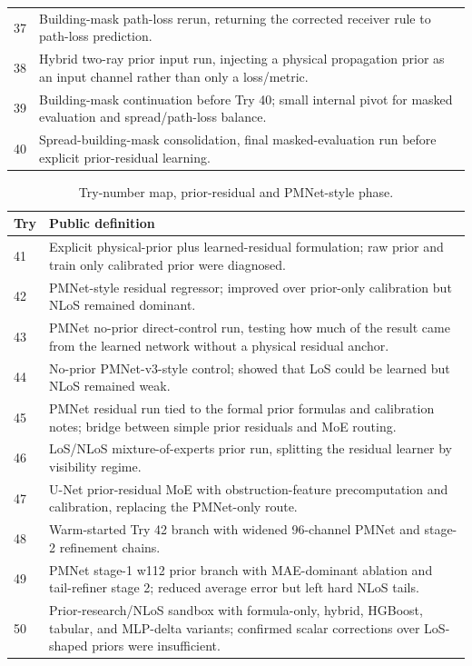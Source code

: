 \begin{table}[H]
\begin{tabularx}{\textwidth}{p{}>{\raggedright\arraybackslash}X}
37 & Building-mask path-loss rerun, returning the corrected receiver rule to path-loss prediction. \\
38 & Hybrid two-ray prior input run, injecting a physical propagation prior as an input channel rather than only a loss/metric. \\
39 & Building-mask continuation before Try 40; small internal pivot for masked evaluation and spread/path-loss balance. \\
40 & Spread-building-mask consolidation, final masked-evaluation run before explicit prior-residual learning. \\
\bottomrule
\end{tabularx}
\end{table}
\small

\begin{table}[H]
\centering
\caption{Try-number map, prior-residual and PMNet-style phase.}
\label{tab:try_map_pmnet}
\tiny
\renewcommand{\arraystretch}{0.78}
\setlength{\tabcolsep}{2pt}
\begin{tabularx}{\textwidth}{p{}>{\raggedright\arraybackslash}X}
\toprule
Try & Public definition \\
\midrule
41 & Explicit physical-prior plus learned-residual formulation; raw prior and train only calibrated prior were diagnosed. \\
42 & PMNet-style residual regressor; improved over prior-only calibration but NLoS remained dominant. \\
43 & PMNet no-prior direct-control run, testing how much of the result came from the learned network without a physical residual anchor. \\
44 & No-prior PMNet-v3-style control; showed that LoS could be learned but NLoS remained weak. \\
45 & PMNet residual run tied to the formal prior formulas and calibration notes; bridge between simple prior residuals and MoE routing. \\
46 & LoS/NLoS mixture-of-experts prior run, splitting the residual learner by visibility regime. \\
47 & U-Net prior-residual MoE with obstruction-feature precomputation and calibration, replacing the PMNet-only route. \\
48 & Warm-started Try 42 branch with widened 96-channel PMNet and stage-2 refinement chains. \\
49 & PMNet stage-1 w112 prior branch with MAE-dominant ablation and tail-refiner stage 2; reduced average error but left hard NLoS tails. \\
50 & Prior-research/NLoS sandbox with formula-only, hybrid, HGBoost, tabular, and MLP-delta variants; confirmed scalar corrections over LoS-shaped priors were insufficient. \\
\bottomrule
\end{tabularx}
\end{table}
\small

